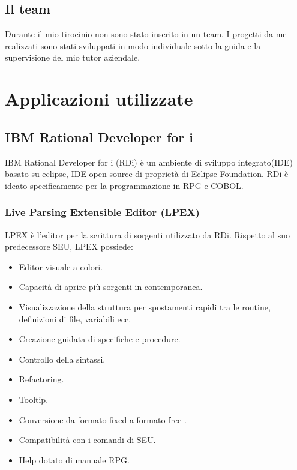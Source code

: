 \documentclass[target=bach,aauheader=,style=]{thud}
\begin{document}
\section{Il team}

Durante il mio tirocinio non sono stato inserito in un team. 
I progetti da me realizzati sono stati sviluppati in modo individuale sotto la guida e la supervisione del mio tutor aziendale.


\chapter{Applicazioni utilizzate}
\section{IBM Rational Developer for i}
IBM Rational Developer for i (RDi) è un ambiente di sviluppo integrato(IDE) basato su eclipse, IDE open source di proprietà di Eclipse Foundation.
RDi è ideato specificamente per la programmazione in RPG e COBOL.

\subsection{Live Parsing Extensible Editor (LPEX)}
LPEX è l'editor per la scrittura di sorgenti utilizzato da RDi. Rispetto al suo predecessore SEU, LPEX possiede:
\begin{itemize}
    \setlength{\itemsep}{0pt} %
    \item Editor visuale a colori.
    \item Capacità di aprire più sorgenti in contemporanea.
    \item Visualizzazione della struttura per spostamenti rapidi tra le routine, definizioni di file, variabili ecc.
    \item Creazione guidata di specifiche e procedure.
    \item Controllo della sintassi.
    \item Refactoring.
    \item Tooltip.
    \item Conversione da formato fixed a formato free .
    \item Compatibilità con i comandi di SEU.
    \item Help dotato di manuale RPG.
\end{itemize}
\end{document}
